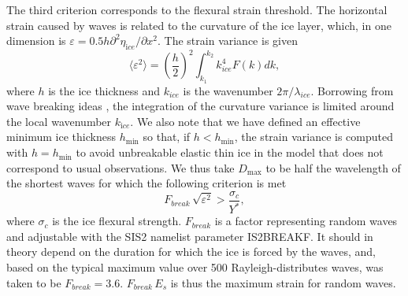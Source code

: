 The third criterion corresponds to the flexural strain threshold. The horizontal 
strain caused by waves is related to 
the curvature of the ice layer, which, in one dimension is 
$\varepsilon = 0.5 h \partial ^2 \eta_{\mathrm ice} / \partial x^2$. 
The strain variance is given 
\begin{equation}
\langle\varepsilon^2\rangle = \left( \frac{h}{2} \right) ^2   \int_{k_1}^{k_2} k_{ice}^4 F(k)dk ,
\label{strain_sign}
\end{equation}
where $h$ is the ice thickness and $k_{ice}$ is the wavenumber $2 \pi /\lambda_{ice}$. 
Borrowing from wave breaking 
ideas \citep{art:BBY00}, the integration of the curvature variance is limited around 
the local wavenumber $k_{\mathrm ice}$. 
We also note that we have defined an effective minimum ice thickness $h_{\min}$ so that, 
if $h<h_{\min}$, the strain 
variance is computed with $h=h_{\min}$ to avoid unbreakable elastic thin ice in the model 
that does not correspond to 
usual observations. We thus take $D_{\max}$ to be half the wavelength of the shortest 
waves for which the following criterion is met 
\begin{equation}
F_{break}\, \sqrt{\varepsilon^2} > \frac{\sigma_c}{Y^*} ,
\label{strain_crit}
\end{equation}
where $\sigma_c$ is the ice flexural strength. $F_{break}$ is a factor representing random waves and adjustable with 
the {\F SIS2} namelist parameter  {\code IS2BREAKF}. It should in theory depend on the duration for which the ice is forced by the 
waves, and, based on the typical maximum value over 500 Rayleigh-distributes waves, was taken to be $F_{break}=3.6$. 
$F_{break} \, E_s$ is thus the maximum strain for random waves. \\ 




